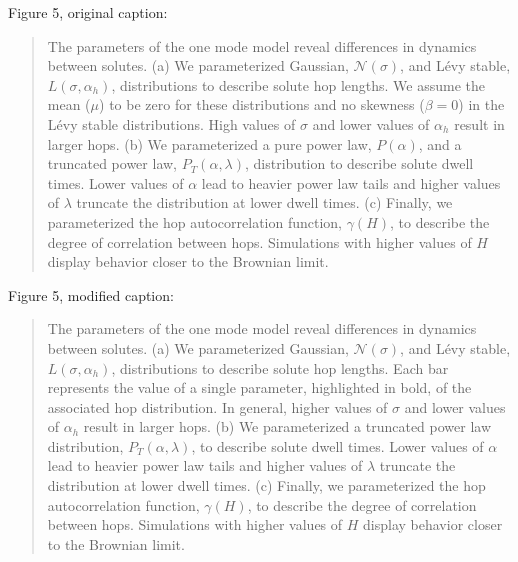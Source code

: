 \documentclass{article}
\begin{document}
\begin{enumerate}[label={Comment \theenumi :}, leftmargin=3.9\parindent]
		Figure 5, original caption:
		
		\begin{quote}
		
		  The parameters of the one mode model reveal differences in dynamics
	      between solutes. (a) We parameterized Gaussian,
	      $\mathcal{N}(\sigma)$, and L\'evy stable, $L(\sigma, \alpha_h)$,
	      distributions to describe solute hop lengths. We assume the mean
	      ($\mu$) to be zero for these distributions and no
	      skewness ($\beta = 0$) in the L\'evy stable distributions. High
	      values of $\sigma$ and lower values of $\alpha_h$ result in larger
	      hops. (b) We parameterized a pure power law, $P(\alpha)$, and a
	      truncated power law, $P_T(\alpha, \lambda)$, distribution to describe
	      solute dwell times. Lower values of $\alpha$ lead to heavier power
	      law tails and higher values of $\lambda$ truncate the distribution at
	      lower dwell times. (c) Finally, we parameterized the hop
	      autocorrelation function, $\gamma(H)$, to describe the degree of
	      correlation between hops. Simulations with higher values of $H$ display
	      behavior closer to the Brownian limit.
	      
		\end{quote}
		
		Figure 5, modified caption:
		
		\begin{quote}
		
		  The parameters of the one mode model reveal differences in dynamics
	      between solutes. (a) We parameterized Gaussian, $\mathcal{N}(\sigma)$, 
	      and L\'evy stable, $L(\sigma, \alpha_h)$, distributions to describe
	      solute hop lengths. 
	      Each bar represents the value of a single parameter,
	      highlighted in bold, of the associated hop distribution.
	      In general, higher values of $\sigma$ and lower values of $\alpha_h$ 
	      result in larger hops. 
	      (b) We parameterized 
	      a truncated power law distribution, $P_T(\alpha, \lambda)$,  to describe
	      solute dwell times. 
	      Lower values of $\alpha$ lead to heavier power
	      law tails and higher values of $\lambda$ truncate the distribution at
	      lower dwell times. (c) Finally, we parameterized the hop
	      autocorrelation function, $\gamma(H)$, to describe the degree of
	      correlation between hops. Simulations with higher values of $H$ display
	      behavior closer to the Brownian limit.
	      

\end{quote}
\end{enumerate}
\end{document}
